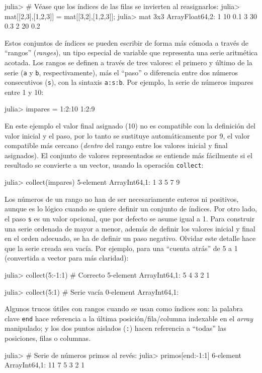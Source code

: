 ﻿\documentclass{article}
\newcommand{\code}{\texttt}
\begin{document}
julia> # Véase que los índices de las filas se invierten al reasignarlos:
julia> mat[[2,3],[1,2,3]] = mat[[3,2],[1,2,3]];
julia> mat
3x3 Array{Float64,2}:
 1 10 0.1
 3 30 0.3
 2 20 0.2

Estos conjuntos de índices se pueden escribir de forma más cómoda a través de ``rangos'' (\emph{ranges}), un tipo especial de variable que representa una serie aritmética acotada. Los rangos se definen a través de tres valores: el primero y último de la serie (\code{a} y \code{b}, respectivamente), más el ``paso'' o diferencia entre dos números consecutivos (\code{s}), con la sintaxis \code{a:s:b}. Por ejemplo, la serie de números impares entre 1 y 10:

julia> impares = 1:2:10
1:2:9

En este ejemplo el valor final asignado (10) no es compatible con la definición del valor inicial y el paso, por lo tanto se sustituye automáticamente por 9, el valor compatible más cercano (\emph{dentro} del rango entre los valores inicial y final asignados). El conjunto de valores representados se entiende más fácilmente si el resultado se convierte a un vector, usando la operación \code{collect}:

julia> collect(impares)
5-element Array{Int64,1}:
 1
 3
 5
 7
 9

Los números de un rango no han de ser necesariamente enteros ni positivos, aunque es lo lógico cuando se quiere definir un conjunto de índices. Por otro lado, el paso \code{s} es un valor opcional, que por defecto se asume igual a 1. Para construir una serie ordenada de mayor a menor, además de definir los valores inicial y final en el orden adecuado, se ha de definir un paso negativo. Olvidar este detalle hace que la serie creada sea vacía. Por ejemplo, para una ``cuenta atrás'' de 5 a 1 (convertida a vector para más claridad):

julia> collect(5:-1:1) # Correcto
5-element Array{Int64,1}:
 5
 4
 3
 2
 1 

julia> collect(5:1) # Serie vacía
0-element Array{Int64,1}:

Algunos trucos útiles con rangos cuando se usan como índices son: la palabra clave \code{end} hace referencia a la última posición/fila/columna indexable en el \emph{array} manipulado; y los dos puntos aislados (\code{:}) hacen referencia a ``todas'' las posiciones, filas o columnas.

julia> # Serie de números primos al revés:
julia> primos[end:-1:1]
6-element Array{Int64,1}:
 11
 7
 5
 3
 2
 1
\end{document}
